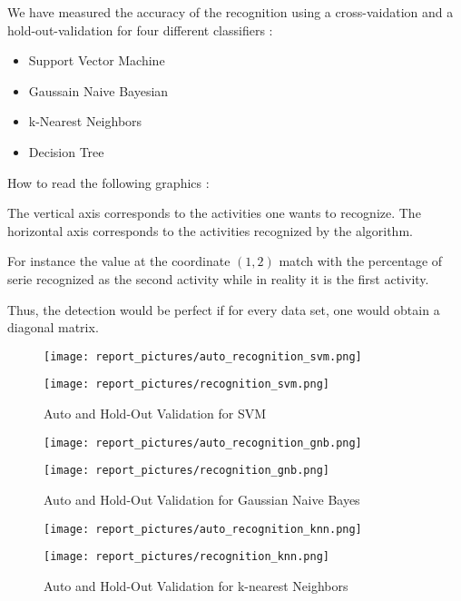 \documentclass[a4,12pt]{article}
\begin{document}
	We have measured the accuracy of the recognition using a cross-vaidation and a hold-out-validation for four different classifiers : 
	
	\begin{itemize}
		\item Support Vector Machine
		\item Gaussain Naive Bayesian
		\item k-Nearest Neighbors
		\item Decision Tree
	\end{itemize}
	
	How to read the following graphics : 
	
	The vertical axis corresponds to the activities one wants to recognize. The horizontal axis corresponds to the activities recognized by the algorithm.
	
	For instance the value at the coordinate $(1,2)$ match with the percentage of serie recognized as the second activity while in reality it is the first activity. 
	
	Thus, the detection would be perfect if for every data set, one would obtain a diagonal matrix.
	
	\begin{figure}[H]
		\centering
			\begin{minipage}[c]{.46\linewidth}
      			\texttt{[image: report\_pictures/auto\_recognition\_svm.png]}
  			\end{minipage} \hfill
   			\begin{minipage}[c]{.46\linewidth}
      			\texttt{[image: report\_pictures/recognition\_svm.png]}
   			\end{minipage}
		\caption{Auto and Hold-Out Validation for SVM}
		\label{svm}
	\end{figure}
	
	\begin{figure}[H]
		\centering
			\begin{minipage}[c]{.46\linewidth}
      			\texttt{[image: report\_pictures/auto\_recognition\_gnb.png]}
  			\end{minipage} \hfill
   			\begin{minipage}[c]{.46\linewidth}
      			\texttt{[image: report\_pictures/recognition\_gnb.png]}
   			\end{minipage}
		\caption{Auto and Hold-Out Validation for Gaussian Naive Bayes}
		\label{gnb}
	\end{figure}
	
	\begin{figure}[H]
		\centering
			\begin{minipage}[c]{.46\linewidth}
      			\texttt{[image: report\_pictures/auto\_recognition\_knn.png]}
  			\end{minipage} \hfill
   			\begin{minipage}[c]{.46\linewidth}
      			\texttt{[image: report\_pictures/recognition\_knn.png]}
   			\end{minipage}
		\caption{Auto and Hold-Out Validation for k-nearest Neighbors}
		\label{knn}
	\end{figure}
	
\end{document}
